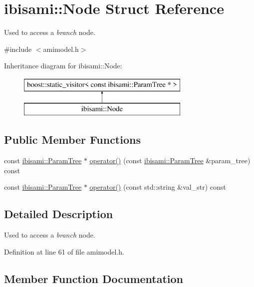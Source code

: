 \hypertarget{structibisami_1_1_node}{}\section{ibisami\+:\+:Node Struct Reference}
\label{structibisami_1_1_node}


Used to access a {\itshape branch} node.  




{\ttfamily \#include $<$amimodel.\+h$>$}

Inheritance diagram for ibisami\+:\+:Node\+:\begin{figure}[H]
\begin{center}
\leavevmode
\includegraphics[height=2.000000cm]{structibisami_1_1_node}
\end{center}
\end{figure}
\subsection*{Public Member Functions}
\begin{DoxyCompactItemize}
\item 
const \hyperlink{structibisami_1_1_param_tree}{ibisami\+::\+Param\+Tree} $\ast$ \hyperlink{structibisami_1_1_node_a138863b6b5304b1daeb7453e6c191900}{operator()} (const \hyperlink{structibisami_1_1_param_tree}{ibisami\+::\+Param\+Tree} \&param\+\_\+tree) const 
\item 
const \hyperlink{structibisami_1_1_param_tree}{ibisami\+::\+Param\+Tree} $\ast$ \hyperlink{structibisami_1_1_node_a0ca5b7bc333470b4772b7bc88434f4c2}{operator()} (const std\+::string \&val\+\_\+str) const 
\end{DoxyCompactItemize}


\subsection{Detailed Description}
Used to access a {\itshape branch} node. 

Definition at line 61 of file amimodel.\+h.



\subsection{Member Function Documentation}
\hypertarget{structibisami_1_1_node_a138863b6b5304b1daeb7453e6c191900}{}
